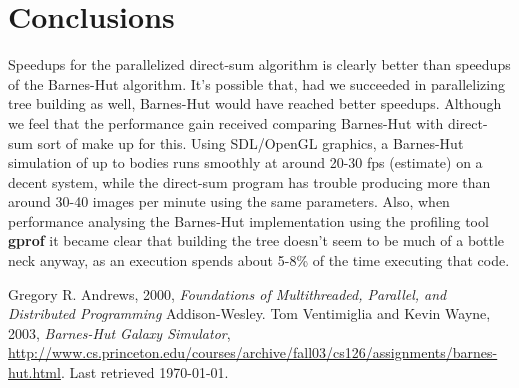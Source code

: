 \documentclass[10pt,a4paper]{article}
\begin{document}
\section{Conclusions}
Speedups for the parallelized direct-sum algorithm is clearly better than speedups of the Barnes-Hut algorithm. It's possible that, had we succeeded in parallelizing tree building as well, Barnes-Hut would have reached better speedups. Although we feel that the performance gain received comparing Barnes-Hut with direct-sum sort of make up for this. Using SDL/OpenGL graphics, a Barnes-Hut simulation of up to bodies runs smoothly at around 20-30 fps (estimate) on a decent system, while the direct-sum program has trouble producing more than around 30-40 images per minute using the same parameters. Also, when performance analysing the Barnes-Hut implementation using the profiling tool \textbf{gprof} it became clear that building the tree doesn't seem to be much of a bottle neck anyway, as an execution spends about 5-8\% of the time executing that code.

\begin{thebibliography}{9}
	Gregory R. Andrews, 2000, \emph{Foundations of Multithreaded, Parallel, and Distributed Programming}
	Addison-Wesley.
	Tom Ventimiglia and Kevin Wayne, 2003, \emph{Barnes-Hut Galaxy Simulator}, \url{http://www.cs.princeton.edu/courses/archive/fall03/cs126/assignments/barnes-hut.html}. Last retrieved \today.
	
\end{thebibliography}
\end{document}
